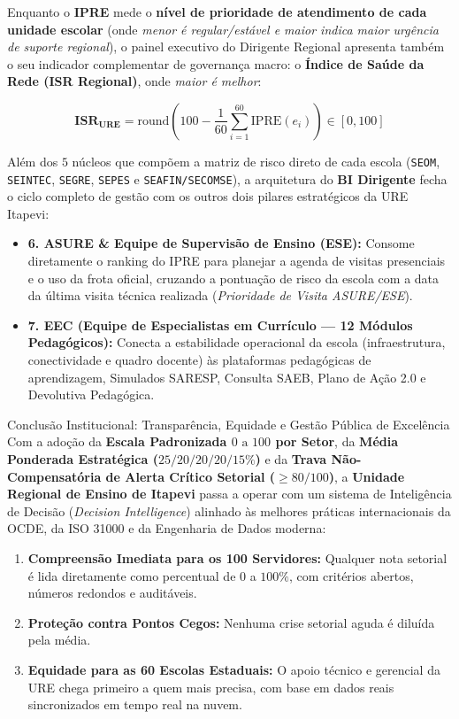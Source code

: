 \documentclass[9pt,a4paper]{extarticle}
\begin{document}
Enquanto o \textbf{IPRE} mede o \textbf{nível de prioridade de atendimento de cada unidade escolar} (onde \emph{menor é regular/estável e maior indica maior urgência de suporte regional}), o painel executivo do Dirigente Regional apresenta também o seu indicador complementar de governança macro: o \textbf{Índice de Saúde da Rede (ISR Regional)}, onde \emph{maior é melhor}:

\begin{equation}
\mathbf{\text{ISR}_{\text{URE}}} = \text{round}\left(100 - \frac{1}{60}\sum_{i=1}^{60} \text{IPRE}(e_i)\right) \in [0, 100]
\end{equation}

Além dos $5$ núcleos que compõem a matriz de risco direto de cada escola (\texttt{SEOM}, \texttt{SEINTEC}, \texttt{SEGRE}, \texttt{SEPES} e \texttt{SEAFIN/SECOMSE}), a arquitetura do \textbf{BI Dirigente} fecha o ciclo completo de gestão com os outros dois pilares estratégicos da URE Itapevi:
\begin{itemize}[leftmargin=1.5em, itemsep=3pt]
    \item \textbf{6. ASURE \& Equipe de Supervisão de Ensino (ESE):} Consome diretamente o ranking do IPRE para planejar a agenda de visitas presenciais e o uso da frota oficial, cruzando a pontuação de risco da escola com a data da última visita técnica realizada (\emph{Prioridade de Visita ASURE/ESE}).
    \item \textbf{7. EEC (Equipe de Especialistas em Currículo --- 12 Módulos Pedagógicos):} Conecta a estabilidade operacional da escola (infraestrutura, conectividade e quadro docente) às plataformas pedagógicas de aprendizagem, Simulados SARESP, Consulta SAEB, Plano de Ação 2.0 e Devolutiva Pedagógica.
\end{itemize}

\begin{execbox}{Conclusão Institucional: Transparência, Equidade e Gestão Pública de Excelência}
Com a adoção da \textbf{Escala Padronizada $0\text{ a }100$ por Setor}, da \textbf{Média Ponderada Estratégica ($25/20/20/20/15\%$)} e da \textbf{Trava Não-Compensatória de Alerta Crítico Setorial ($\ge 80/100$)}, a \textbf{Unidade Regional de Ensino de Itapevi} passa a operar com um sistema de Inteligência de Decisão (\emph{Decision Intelligence}) alinhado às melhores práticas internacionais da OCDE, da ISO 31000 e da Engenharia de Dados moderna:
\begin{enumerate}[nosep, leftmargin=1.5em]
    \item \textbf{Compreensão Imediata para os 100 Servidores:} Qualquer nota setorial é lida diretamente como percentual de $0$ a $100\%$, com critérios abertos, números redondos e auditáveis.
    \item \textbf{Proteção contra Pontos Cegos:} Nenhuma crise setorial aguda é diluída pela média.
    \item \textbf{Equidade para as 60 Escolas Estaduais:} O apoio técnico e gerencial da URE chega primeiro a quem mais precisa, com base em dados reais sincronizados em tempo real na nuvem.
\end{enumerate}
\end{execbox}
\end{document}
